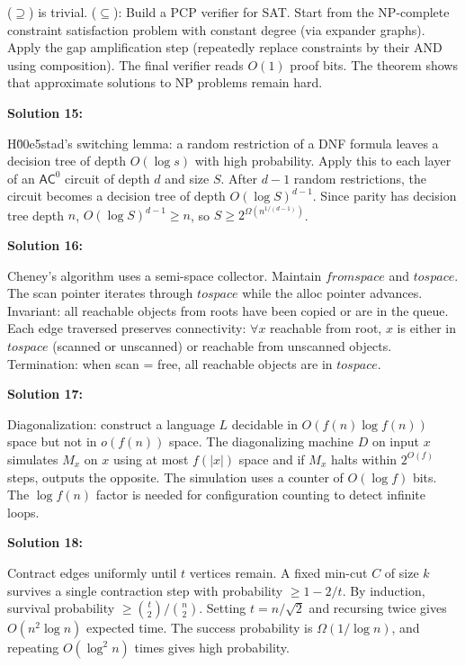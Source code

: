 \documentclass[12pt,a4paper]{exam}
\begin{document}
($\supseteq$) is trivial. ($\subseteq$): Build a PCP verifier for SAT. Start from the NP-complete constraint satisfaction problem with constant degree (via expander graphs). Apply the gap amplification step (repeatedly replace constraints by their AND using composition). The final verifier reads $O(1)$ proof bits. The theorem shows that approximate solutions to NP problems remain hard.

\vspace{0.5cm}

\textbf{Solution 15:}

H\u00e5stad's switching lemma: a random restriction of a DNF formula leaves a decision tree of depth $O(\log s)$ with high probability. Apply this to each layer of an $\mathsf{AC}^0$ circuit of depth $d$ and size $S$. After $d-1$ random restrictions, the circuit becomes a decision tree of depth $O(\log S)^{d-1}$. Since parity has decision tree depth $n$, $O(\log S)^{d-1} \geq n$, so $S \geq 2^{\Omega(n^{1/(d-1)})}$.

\vspace{0.5cm}

\textbf{Solution 16:}

Cheney's algorithm uses a semi-space collector. Maintain $fromspace$ and $tospace$. The scan pointer iterates through $tospace$ while the alloc pointer advances. Invariant: all reachable objects from roots have been copied or are in the queue. Each edge traversed preserves connectivity: $\forall x$ reachable from root, $x$ is either in $tospace$ (scanned or unscanned) or reachable from unscanned objects. Termination: when scan = free, all reachable objects are in $tospace$.

\vspace{0.5cm}

\textbf{Solution 17:}

Diagonalization: construct a language $L$ decidable in $O(f(n)\log f(n))$ space but not in $o(f(n))$ space. The diagonalizing machine $D$ on input $x$ simulates $M_x$ on $x$ using at most $f(|x|)$ space and if $M_x$ halts within $2^{O(f)}$ steps, outputs the opposite. The simulation uses a counter of $O(\log f)$ bits. The $\log f(n)$ factor is needed for configuration counting to detect infinite loops.

\vspace{0.5cm}

\textbf{Solution 18:}

Contract edges uniformly until $t$ vertices remain. A fixed min-cut $C$ of size $k$ survives a single contraction step with probability $\geq 1 - 2/t$. By induction, survival probability $\geq \binom{t}{2}/\binom{n}{2}$. Setting $t = n/\sqrt{2}$ and recursing twice gives $O(n^2 \log n)$ expected time. The success probability is $\Omega(1/\log n)$, and repeating $O(\log^2 n)$ times gives high probability.
\end{document}
